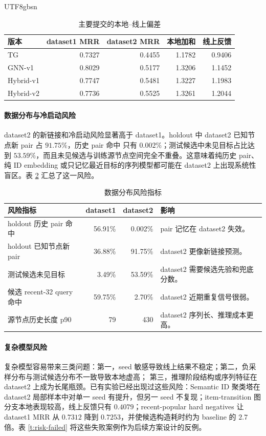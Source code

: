 \documentclass[letterpaper,11pt,leqno]{article}
\begin{document}
\begin{CJK*}{UTF8}{gbsn}
\begin{table}[H]
\caption{主要提交的本地--线上偏差}
\label{t:risk-local-online}
\begin{tabular*}{\linewidth}{@{\extracolsep{\fill}}lrrrr}
\toprule
版本 & dataset1 MRR & dataset2 MRR & 本地加和 & 线上反馈 \\
\midrule
TG & 0.7327 & 0.4455 & 1.1782 & 0.9406 \\
GNN-v1 & 0.8029 & 0.5177 & 1.3206 & 1.1452 \\
Hybrid-v1 & 0.7747 & 0.5481 & 1.3227 & 1.1983 \\
Hybrid-v2 & 0.7736 & 0.5525 & 1.3261 & 1.2044 \\
\bottomrule
\end{tabular*}
\end{table}

\paragraph{数据分布与冷启动风险}
dataset2 的新链接和冷启动风险显著高于 dataset1。holdout 中 dataset2 已知节点新 pair 占 $91.75\%$，历史 pair 命中
只有 $0.002\%$；测试候选中未见目标占比达到 $53.59\%$，而且未见候选与训练源节点空间完全不重叠。这意味着纯历史 pair、
纯 ID embedding 或只记忆最近目标的序列模型都可能在 dataset2 上出现系统性盲区。表 \ref{t:risk-data} 汇总了这一风险。

\begin{table}[H]
\caption{数据分布风险指标}
\label{t:risk-data}
\begin{tabular*}{\linewidth}{@{\extracolsep{\fill}}lrrl}
\toprule
风险指标 & dataset1 & dataset2 & 影响 \\
\midrule
holdout 历史 pair 命中 & 56.91\% & 0.002\% & pair 记忆在 dataset2 失效。 \\
holdout 已知节点新 pair & 36.88\% & 91.75\% & dataset2 更像新链接预测。 \\
测试候选未见目标 & 3.49\% & 53.59\% & dataset2 需要候选先验和兜底分数。 \\
候选 recent-32 query 命中 & 59.75\% & 2.70\% & dataset2 近期重复信号很弱。 \\
源节点历史长度 p90 & 79 & 430 & dataset2 序列长、推理成本更高。 \\
\bottomrule
\end{tabular*}
\end{table}

\paragraph{复杂模型风险}
复杂模型容易带来三类问题：第一，seed 敏感导致线上结果不稳定；第二，负采样分布与测试候选分布不一致导致本地虚高；
第三，推理阶段结构或序列特征在 dataset2 上成为长尾瓶颈。已有实验已经出现过这些风险：Semantic ID 聚类塔在
dataset2 局部样本中对单一 seed 有提升，但另一 seed 不复现；item-transition 图分支本地表现较高，线上反馈只有
$0.4079$；recent-popular hard negatives 让 dataset1 MRR 从 $0.7312$ 降到 $0.7253$，并使候选构造耗时约为 baseline
的 $2.7$ 倍。表 \ref{t:risk-failed} 将这些失败案例作为后续方案设计的反例。


\end{CJK*}
\end{document}
